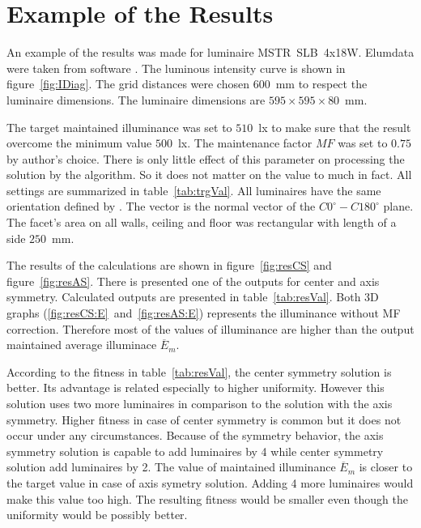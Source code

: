 \section{Example of the Results}

An example of the results was made for luminaire MSTR~SLB~4x18W. Elumdata were taken from software . The luminous intensity curve is shown in figure~\ref{fig:IDiag}. The grid distances were chosen $600$~mm to respect the luminaire dimensions. The luminaire dimensions are $595\times 595\times 80$~mm.

The target maintained illuminance was set to $510$~lx to make sure that the result overcome the minimum value $500$~lx. The maintenance factor $MF$ was set  to $0.75$ by author's choice. There is only little effect of this parameter on processing the solution by the algorithm. So it does not matter on the value to much in fact. All settings are summarized in table~\ref{tab:trgVal}. All luminaires have the same orientation defined by . The vector is the normal vector of the $C0^\circ-C180^\circ$ plane. The facet's area on all walls, ceiling and floor was rectangular with length of a side $250$~mm.

The results of the calculations are shown in figure~\ref{fig:resCS} and figure~\ref{fig:resAS}. There is presented one of the outputs for center and axis symmetry.  Calculated outputs are presented in table~\ref{tab:resVal}. Both 3D graphs (\ref{fig:resCS:E}~and~\ref{fig:resAS:E}) represents the illuminance without MF correction. Therefore most of the values of illuminance are higher than the output maintained average illuminace $\overline{E}_{m}$.

According to the fitness in table~\ref{tab:resVal}, the center symmetry solution is better. Its advantage is related especially to higher uniformity. However this solution uses two more luminaires in comparison to the solution with the axis symmetry. Higher fitness in case of center symmetry is common but it does not occur under any circumstances. Because of the symmetry behavior, the axis symmetry solution is capable to add luminaires by 4 while center symmetry solution add luminaires by 2. The value of maintained illuminance $\overline{E}_{m}$ is closer to the target value in case of axis symetry solution. Adding 4 more luminaires would make this value too high. The resulting fitness would be smaller even though the uniformity would be possibly better.

